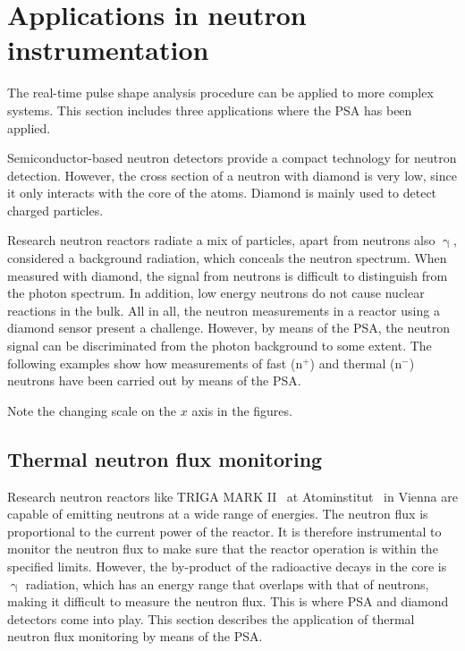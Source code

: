 \section{Applications in neutron instrumentation}
\label{sec:nm}

The real-time pulse shape analysis procedure can be applied to more complex systems. This section includes three applications where the PSA has been applied.

Semiconductor-based neutron detectors provide a compact technology for neutron detection. However, the cross section of a neutron with diamond is very low, since it only interacts with the core of the atoms. Diamond is mainly used to detect charged particles. 

Research neutron reactors radiate a mix of particles, apart from neutrons also $\upgamma$, considered a background radiation, which conceals the neutron spectrum. When measured with diamond, the signal from neutrons is difficult to distinguish from the photon spectrum. In addition, low energy neutrons do not cause nuclear reactions in the bulk. All in all, the neutron measurements in a reactor using a diamond sensor present a challenge. However, by means of the PSA, the neutron signal can be discriminated from the photon background to some extent. The following examples show how measurements of fast (n$^+$) and thermal (n$^-$) neutrons have been carried out by means of the PSA.

Note the changing scale on the $x$ axis in the figures.


\subsection{Thermal neutron flux monitoring}
Research neutron reactors like TRIGA MARK II~\cite{Triga:00000} at Atominstitut~\cite{AtomInst:00000} in Vienna are capable of emitting neutrons at a wide range of energies. The neutron flux is proportional to the current power of the reactor. It is therefore instrumental to monitor the neutron flux to make sure that the reactor operation is within the specified limits. However, the by-product of the radioactive decays in the core is $\upgamma$ radiation, which has an energy range that overlaps with that of neutrons, making it difficult to measure the neutron flux. This is where PSA and diamond detectors come into play. This section describes the application of thermal neutron flux monitoring by means of the PSA.


